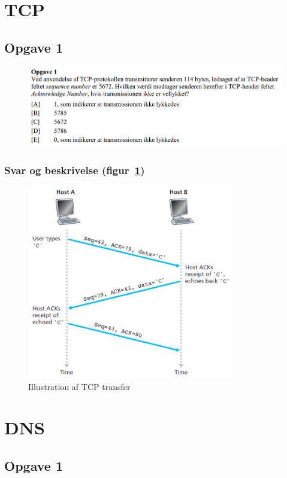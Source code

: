 \section{TCP}
\subsection{Opgave 1}
\begin{figure}[H]
	\centering
	\includegraphics[width=\linewidth]{figs/sommer15/SE15OP1}
	\caption{}
	\label{fig:SE15OP1}
\end{figure}

\subsubsection{Svar og beskrivelse (figur~\ref{fig:SE15OP1})}

\begin{figure}[H]
	\centering
	\includegraphics[width=0.8\textwidth]{figs/sommer15/tcptransfer}
	\caption{Illustration af TCP transfer}
	\label{fig:TCPtransfer}
\end{figure}

\section{DNS}
\subsection{Opgave 1}


